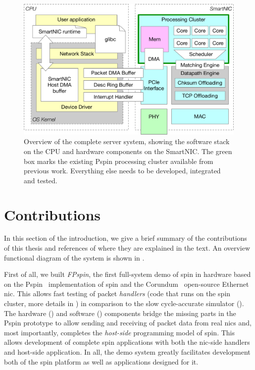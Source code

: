 \begin{figure}
    \centering
    \includegraphics[width=.9\textwidth]{figures/system-overview.pdf}
    \caption{Overview of the complete server system, showing the software stack on the CPU and hardware components on the SmartNIC.  The green box marks the existing P\acs{spin} processing cluster available from previous work.  Everything else needs to be developed, integrated and tested.}
    \label{fig:full-system}
\end{figure}

\section{Contributions} \label{sec:contributions}

In this section of the introduction, we give a brief summary of the contributions of this thesis and references of where they are explained in the text.  An overview functional diagram of the system is shown in .

First of all, we built \emph{FP\acs{spin}}, the first full-system demo of \ac{spin} in hardware based on the P\acs{spin}~\cite{di_girolamo_pspin_2021} implementation of \ac{spin} and the Corundum~\cite{forencich_corundum_2020} open-source Ethernet \ac{nic}.  This allows fast testing of packet \emph{handlers} (code that runs on the \ac{spin} cluster, more details in ) in comparison to the slow cycle-accurate simulator ().  The hardware () and software () components bridge the missing parts in the P\acs{spin} prototype to allow sending and receiving of packet data from real \ac{nic}s and, most importantly, completes the \emph{host-side} programming model of \ac{spin}.  This allows development of complete \ac{spin} applications with both the \ac{nic}-side handlers and host-side application.  In all, the demo system greatly facilitates development both of the \ac{spin} platform as well as applications designed for it.

